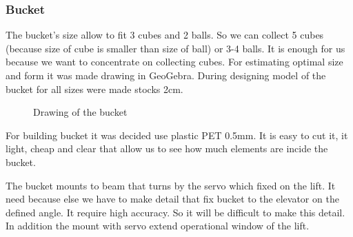 \subsubsection{Bucket} 
The bucket's size allow to fit 3 cubes and 2 balls. So we can collect 5 cubes (because size of cube is smaller than size of ball) or 3-4 balls. It is enough for us because we want to concentrate on collecting cubes. 	\newline
For estimating optimal size and form it was made drawing in GeoGebra. During designing model of the bucket for all sizes were made stocks 2cm.
\begin{figure}[H]
	\begin{minipage}[h]{1\linewidth}
		\caption{Drawing of the bucket}
	\end{minipage}
\end{figure}

For building bucket it was decided use plastic PET 0.5mm. It is easy to cut it, it light, cheap and clear that allow us to see how much elements are incide the bucket.\newline  

The bucket mounts to beam that turns by the servo which fixed on the lift. It need because else we have to make detail that fix bucket to the elevator on the defined angle. It require high accuracy. So it will be difficult to make this detail. In addition the mount with servo extend operational window of the lift. \newline

